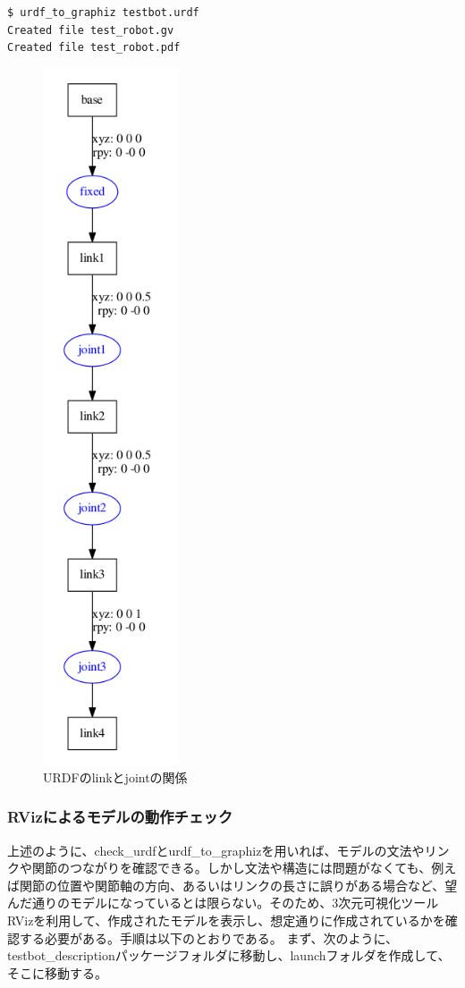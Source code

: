 \begin{lstlisting}[language=ROS]
$ urdf_to_graphiz testbot.urdf
Created file test_robot.gv
Created file test_robot.pdf
\end{lstlisting}

\begin{figure}[htp]
  \centering
  \includegraphics[width=4cm]{pictures/chapter11/pic_11_05.png}
  \caption{URDFのlinkとjointの関係}
\end{figure}

\subsubsection{RVizによるモデルの動作チェック}
上述のように、check\_urdfとurdf\_to\_graphizを用いれば、モデルの文法やリンクや関節のつながりを確認できる。しかし文法や構造には問題がなくても、例えば関節の位置や関節軸の方向、あるいはリンクの長さに誤りがある場合など、望んだ通りのモデルになっているとは限らない。そのため、3次元可視化ツールRVizを利用して、作成されたモデルを表示し、想定通りに作成されているかを確認する必要がある。手順は以下のとおりである。
まず、次のように、testbot\_descriptionパッケージフォルダに移動し、launchフォルダを作成して、そこに移動する。

